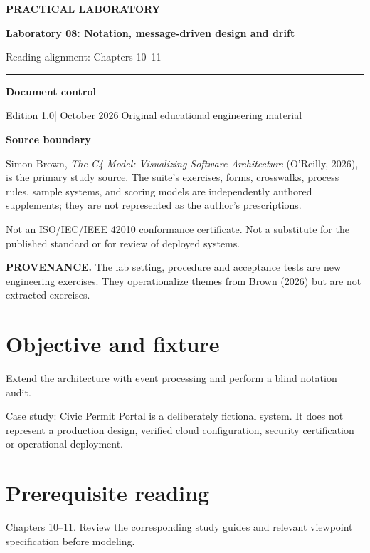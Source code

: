 \documentclass[10pt,letterpaper]{article}
\newcommand{\SourceNote}[1]{\par\smallskip\noindent\colorbox{C4Light}{\parbox{0.94\linewidth}{\footnotesize\textbf{PROVENANCE.} #1}}\par\medskip}
\newcommand{\DocStart}[3]{%
\begin{document}
\begin{titlepage}
\renewcommand{\thepage}{title-\arabic{page}}
\vspace*{0.55in}
{\sffamily\bfseries\small\color{C4Teal}#1}\par\vspace{0.24in}
{\sffamily\bfseries\fontsize{26}{31}\selectfont\color{C4Navy}#2}\par\vspace{0.18in}
{\large\color{C4Gray}#3}\par\vspace{0.4in}
\textcolor{C4Teal}{\rule{\linewidth}{1.15pt}}\par\vspace{0.24in}
\textbf{Document control}\par
Edition 1.0\quad|\quad 30 October 2026\quad|\quad Original educational engineering material\par
\vspace{0.17in}
\textbf{Source boundary}\par
Simon Brown, \emph{The C4 Model: Visualizing Software Architecture} (O'Reilly, 2026), is the primary study source. The suite's exercises, forms, crosswalks, process rules, sample systems, and scoring models are independently authored supplements; they are not represented as the author's prescriptions.\par
\vfill
{\small\color{C4Gray}Not an ISO/IEC/IEEE 42010 conformance certificate. Not a substitute for the published standard or for review of deployed systems.}\par
\end{titlepage}
}
\DocStart{PRACTICAL LABORATORY}{Laboratory 08: Notation, message-driven design and drift}{Reading alignment: Chapters 10–11}
\SourceNote{The lab setting, procedure and acceptance tests are new engineering exercises. They operationalize themes from Brown (2026) but are not extracted exercises.}
\section{Objective and fixture}
Extend the architecture with event processing and perform a blind notation audit.

Case study: Civic Permit Portal is a deliberately fictional system. It does not represent a production design, verified cloud configuration, security certification or operational deployment.


\section{Prerequisite reading}
Chapters 10–11. Review the corresponding study guides and relevant viewpoint specification before modeling.
\end{document}
